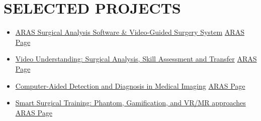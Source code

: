 \documentclass[11pt,a4paper,sans]{moderncv} %
\begin{document}
		\section{SELECTED PROJECTS}
	\begin{itemize}
		\item \href{https://aras.kntu.ac.ir/research-themes/ai-and-vr-in-medical-robotics/#:~:text=Real%2DTime%20Analyzer%20(-,ESERA,-)%0AThis%20software}{\authorimg{Images/aras.png} ARAS Surgical Analysis Software \& Video-Guided Surgery System} \hfill  \href{https://aras.kntu.ac.ir/research-themes/ai-and-vr-in-medical-robotics/#:~:text=Real%2DTime%20Analyzer%20(-,ESERA,-)%0AThis%20software}{ARAS Page}
		
        \vspace{1em}
          \item \href{https://aras.kntu.ac.ir/research-themes/ai-and-vr-in-medical-robotics/#:~:text=Video%20Understanding%20in%20Medical%20Application%3A%20Surgical%20Analysis%2C%20Skill%20Assessment%20and%20Transfer}{\authorimg{Images/aras.png} Video Understanding: Surgical Analysis, Skill Assessment and Transfer} \hfill \href{https://aras.kntu.ac.ir/research-themes/ai-and-vr-in-medical-robotics/#:~:text=Video%20Understanding%20in%20Medical%20Application%3A%20Surgical%20Analysis%2C%20Skill%20Assessment%20and%20Transfer}{ARAS Page}
        \vspace{1em}
          \item \href{https://aras.kntu.ac.ir/research-themes/ai-and-vr-in-medical-robotics/#:~:text=Computer%2DAided%20Detection%20and%20Diagnosis%20in%20Medical%20Imaging}{\authorimg{Images/aras.png} Computer-Aided Detection and Diagnosis in Medical Imaging} \hfill \href{https://aras.kntu.ac.ir/research-themes/ai-and-vr-in-medical-robotics/#:~:text=Computer%2DAided%20Detection%20and%20Diagnosis%20in%20Medical%20Imaging}{ARAS Page}
        \vspace{1em}
          \item \href{https://aras.kntu.ac.ir/research-themes/ai-and-vr-in-medical-robotics/#:~:text=Smart%20Surgical%20Training%3A%20Phantom%2C%20Gamification%2C%20and%20VR/MR%20approaches}{\authorimg{Images/aras.png} Smart Surgical Training: Phantom, Gamification, and VR/MR approaches} \hfill \href{https://aras.kntu.ac.ir/research-themes/ai-and-vr-in-medical-robotics/#:~:text=Smart%20Surgical%20Training%3A%20Phantom%2C%20Gamification%2C%20and%20VR/MR%20approaches}{ARAS Page}
  

\end{itemize}
\end{document}
